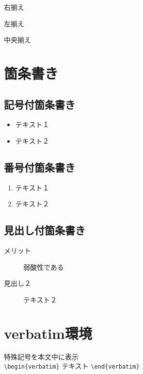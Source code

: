 \documentclass[12pt,a4j,twocolumn]{jarticle}
\begin{document}
\begin{flushright}
右揃え
\end{flushright}

\begin{flushleft}
左揃え
\end{flushleft}

\begin{center}
中央揃え
\end{center}

\section{箇条書き}

\subsection{記号付箇条書き}

\begin{itemize}
\item テキスト１
\item テキスト２
\end{itemize}

\subsection{番号付箇条書き}
\begin{enumerate}
\item テキスト１
\item テキスト２
\end{enumerate}

\subsection{見出し付箇条書き}
\begin{description}
\item[メリット]弱酸性である
\item[見出し２]テキスト２
\end{description}

\section{verbatim環境}

特殊記号を本文中に表示\\

\verb+\begin{verbatim}+ テキスト \verb+\end{verbatim}+ \\
\end{document}
